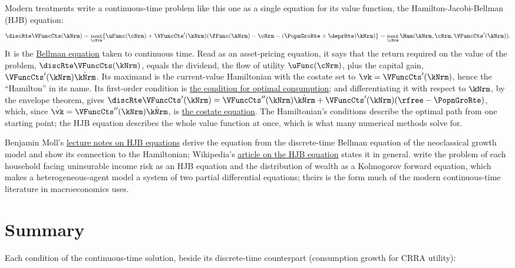 \documentclass{econark}
\begin{document}
Modern treatments write a continuous-time problem like this one as a single equation for its value function, the Hamilton-Jacobi-Bellman (HJB) equation:
\begin{equation}
  \discRte \VFuncCts(\kNrm) = \max_{\cNrm} \{\uFunc(\cNrm) + \VFuncCts'(\kNrm)(\fFunc(\kNrm)-\cNrm-(\PopnGroRte+\deprRte)\kNrm)\} = \max_{\cNrm} \Ham(\kNrm,\cNrm,\VFuncCts'(\kNrm)) . \label{eq:HVD-hjb}
\end{equation}
It is the \hyperref[eq:HVD-bellman]{Bellman equation} taken to continuous time. Read as an asset-pricing equation, it says that the return required on the value of the problem, $\discRte \VFuncCts(\kNrm)$, equals the dividend, the flow of utility $\uFunc(\cNrm)$, plus the capital gain, $\VFuncCts'(\kNrm)\dot{\kNrm}$. Its maximand is the current-value Hamiltonian with the costate set to $\vk = \VFuncCts'(\kNrm)$, hence the ``Hamilton'' in its name. Its first-order condition is \hyperref[eq:uceqvk]{the condition for optimal consumption}; and differentiating it with respect to $\kNrm$, by the envelope theorem, gives $\discRte \VFuncCts'(\kNrm) = \VFuncCts''(\kNrm)\dot{\kNrm} + \VFuncCts'(\kNrm)(\rfree-\PopnGroRte)$, which, since $\dot{\vk} = \VFuncCts''(\kNrm)\dot{\kNrm}$, is \hyperref[eq:lamgrow]{the costate equation}. The Hamiltonian's conditions describe the optimal path from one starting point; the HJB equation describes the whole value function at once, which is what many numerical methods solve for.

Benjamin Moll's \href{https://benjaminmoll.com/wp-content/uploads/2019/07/Lecture3_2149.pdf}{lecture notes on HJB equations} derive the equation from the discrete-time Bellman equation of the neoclassical growth model and show its connection to the Hamiltonian; Wikipedia's \href{https://en.wikipedia.org/wiki/Hamilton\%E2\%80\%93Jacobi\%E2\%80\%93Bellman_equation}{article on the HJB equation} states it in general. \citet{achdouHACT} write the problem of each household facing uninsurable income risk as an HJB equation and the distribution of wealth as a Kolmogorov forward equation, which makes a heterogeneous-agent model a system of two partial differential equations; theirs is the form much of the modern continuous-time literature in macroeconomics uses.

\section{Summary}

Each condition of the continuous-time solution, beside its discrete-time counterpart (consumption growth for CRRA utility):
\end{document}
